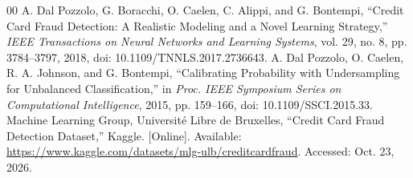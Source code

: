 \documentclass[conference]{IEEEtran}
\begin{document}
\begin{thebibliography}{00}
 A. Dal Pozzolo, G. Boracchi, O. Caelen, C. Alippi, and G. Bontempi, ``Credit Card Fraud Detection: A Realistic Modeling and a Novel Learning Strategy,'' \emph{IEEE Transactions on Neural Networks and Learning Systems}, vol. 29, no. 8, pp. 3784--3797, 2018, doi: 10.1109/TNNLS.2017.2736643.
 A. Dal Pozzolo, O. Caelen, R. A. Johnson, and G. Bontempi, ``Calibrating Probability with Undersampling for Unbalanced Classification,'' in \emph{Proc. IEEE Symposium Series on Computational Intelligence}, 2015, pp. 159--166, doi: 10.1109/SSCI.2015.33.
 Machine Learning Group, Universit\'e Libre de Bruxelles, ``Credit Card Fraud Detection Dataset,'' Kaggle. [Online]. Available: \url{https://www.kaggle.com/datasets/mlg-ulb/creditcardfraud}. Accessed: Oct. 23, 2026.
\end{thebibliography}
\end{document}
